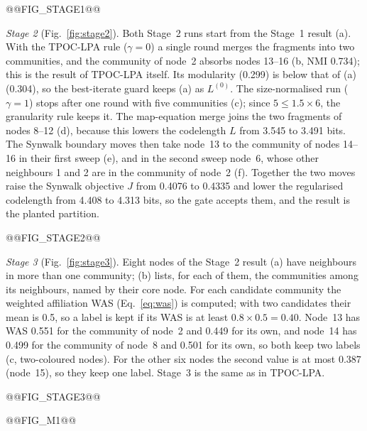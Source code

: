 \documentclass[conference]{IEEEtran}
\begin{document}
@@FIG_STAGE1@@

\emph{Stage 2} (Fig.~\ref{fig:stage2}). Both Stage~2 runs start from the Stage~1 result (a). With the TPOC-LPA rule ($\gamma=0$) a single round merges the fragments into two communities, and the community of node~2 absorbs nodes 13--16 (b, NMI 0.734); this is the result of TPOC-LPA itself. Its modularity (0.299) is below that of (a) (0.304), so the best-iterate guard keeps (a) as $L^{(0)}$. The size-normalised run ($\gamma=1$) stops after one round with five communities (c); since $5\le1.5\times6$, the granularity rule keeps it. The map-equation merge joins the two fragments of nodes 8--12 (d), because this lowers the codelength $L$ from 3.545 to 3.491 bits. The Synwalk boundary moves then take node~13 to the community of nodes 14--16 in their first sweep (e), and in the second sweep node~6, whose other neighbours 1 and 2 are in the community of node~2 (f). Together the two moves raise the Synwalk objective $J$ from 0.4076 to 0.4335 and lower the regularised codelength from 4.408 to 4.313 bits, so the gate accepts them, and the result is the planted partition.

@@FIG_STAGE2@@

\emph{Stage 3} (Fig.~\ref{fig:stage3}). Eight nodes of the Stage~2 result (a) have neighbours in more than one community; (b) lists, for each of them, the communities among its neighbours, named by their core node. For each candidate community the weighted affiliation WAS (Eq.~\eqref{eq:was}) is computed; with two candidates their mean is 0.5, so a label is kept if its WAS is at least $0.8\times0.5=0.40$. Node~13 has WAS 0.551 for the community of node~2 and 0.449 for its own, and node~14 has 0.499 for the community of node~8 and 0.501 for its own, so both keep two labels (c, two-coloured nodes). For the other six nodes the second value is at most 0.387 (node~15), so they keep one label. Stage~3 is the same as in TPOC-LPA.

@@FIG_STAGE3@@










@@FIG_M1@@
\end{document}
